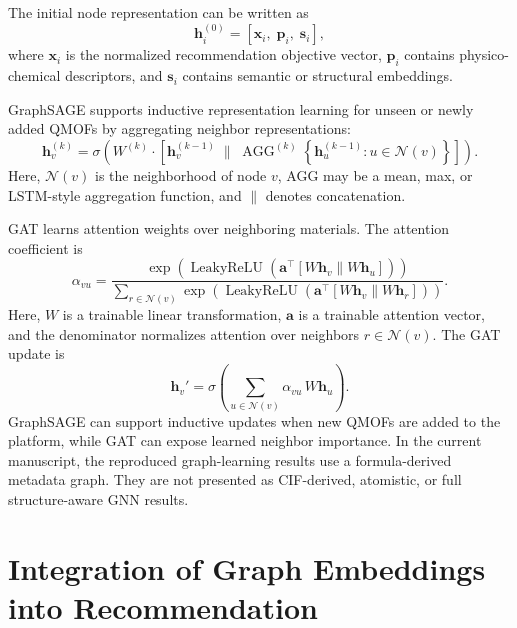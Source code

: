 \documentclass[12pt,a4paper]{article}
\begin{document}
The initial node representation can be written as
\begin{equation}
  \mathbf{h}_i^{(0)} = [\mathbf{x}_i,\; \mathbf{p}_i,\; \mathbf{s}_i],
\end{equation}
where $\mathbf{x}_i$ is the normalized recommendation objective vector, $\mathbf{p}_i$ contains physico-chemical descriptors, and $\mathbf{s}_i$ contains semantic or structural embeddings.

GraphSAGE supports inductive representation learning for unseen or newly added QMOFs by aggregating neighbor representations:
\begin{equation}
  \mathbf{h}_v^{(k)} = \sigma\!\left(W^{(k)}\cdot\left[\mathbf{h}_v^{(k-1)}\;\Big\|\;\operatorname{AGG}^{(k)}\!\left\{\mathbf{h}_u^{(k-1)}:u\in\mathcal{N}(v)\right\}\right]\right).
\end{equation}
Here, $\mathcal{N}(v)$ is the neighborhood of node $v$, AGG may be a mean, max, or LSTM-style aggregation function, and $\|$ denotes concatenation.

GAT learns attention weights over neighboring materials. The attention coefficient is
\begin{equation}
  \alpha_{vu} = \frac{\exp\!\left(\operatorname{LeakyReLU}\!\left(\mathbf{a}^\top[W\mathbf{h}_v\|W\mathbf{h}_u]\right)\right)}{\sum_{r\in\mathcal{N}(v)}\exp\!\left(\operatorname{LeakyReLU}\!\left(\mathbf{a}^\top[W\mathbf{h}_v\|W\mathbf{h}_r]\right)\right)}.
\end{equation}
Here, $W$ is a trainable linear transformation, $\mathbf{a}$ is a trainable attention vector, and the denominator normalizes attention over neighbors $r \in \mathcal{N}(v)$. The GAT update is
\begin{equation}
  \mathbf{h}_v' = \sigma\!\left(\sum_{u\in\mathcal{N}(v)}\alpha_{vu}\,W\mathbf{h}_u\right).
\end{equation}
GraphSAGE can support inductive updates when new QMOFs are added to the platform, while GAT can expose learned neighbor importance. In the current manuscript, the reproduced graph-learning results use a formula-derived metadata graph. They are not presented as CIF-derived, atomistic, or full structure-aware GNN results.

\section{Integration of Graph Embeddings into Recommendation}
\label{sec:graph_int}
\end{document}
